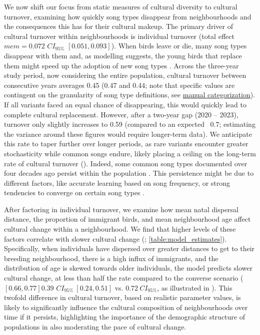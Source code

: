 \documentclass[9pt, onecolumn, twoside, lineno]{gsajnl}
\begin{document}
We now shift our focus from static measures of cultural diversity to cultural turnover, examining how quickly song types disappear from neighbourhoods and the consequences this has for their cultural makeup. The primary driver of cultural turnover within neighbourhoods is individual turnover (total effect $mem = 0.072$ $CI_{95\%}$ $[0.051, 0.093]$). When birds leave or die, many song types disappear with them and, as modelling suggests, the young birds that replace them might speed up the adoption of new song types \autocite{dyble2024}. Across the three-year study period, now considering the entire population, cultural turnover between consecutive years averages 0.45 (0.47 and 0.44; note that specific values are contingent on the granularity of song type definitions, see \hyperref[sc:manual-categorization]{manual categorization}). If all variants faced an equal chance of disappearing, this would quickly lead to complete cultural replacement. However, after a two-year gap (2020 -- 2023), turnover only slightly increases to 0.59 (compared to an expected ~0.7; estimating the variance around these figures would require longer-term data). We anticipate this rate to taper further over longer periods, as rare variants encounter greater stochasticity while common songs endure, likely placing a ceiling on the long-term rate of cultural turnover (). Indeed, some common song types documented over four decades ago persist within the population \autocite{mcgregor1982b, keen2020}. This persistence might be due to different factors, like accurate learning based on song frequency, or strong tendencies to converge on certain song types \autocite{lachlan2018, tchernichovski2021, james2017, claidiere2007}.

After factoring in individual turnover, we examine how mean natal dispersal distance, the proportion of immigrant birds, and mean neighbourhood age affect cultural change within a neighbourhood. We find that higher levels of these factors correlate with slower cultural change  (; \autoref{table:model_estimates}). Specifically, when individuals have dispersed over greater distances to get to their breeding neighbourhood, there is a high influx of immigrants, and the distribution of age is skewed towards older individuals, the model predicts slower cultural change, at less than half the rate compared to the converse scenario ($[0.66, 0.77]$$0.39$ $CI_{95\%}~[0.24, 0.51]$ vs. $0.72~CI_{95\%}$, as illustrated in ). This twofold difference in cultural turnover, based on realistic parameter values, is likely to significantly influence the cultural composition of neighbourhoods over time if it persists, highlighting the importance of the demographic structure of populations in also moderating the pace of cultural change.
\end{document}
